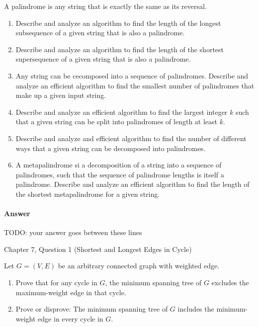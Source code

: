 \documentclass{article}
\begin{document}
A palindrome is any string that is exactly the same as its reversal.
\begin{enumerate}[label=(\alph*)]
    \item Describe and analyze an algorithm to find the length of the longest subsequence of a given string that is also a palindrome.
    \item Describe and analyze an algorithm to find the length of the shortest supersequence of a given string that is also a palindrome.
    \item Any string can be cecomposed into a sequence of palindromes.
    Describe and analyze an efficient algorithm to find the smallest number of palindromes that make up a given input string.
    \item Describe and analyze an efficient algorithm to find the largest integer $k$ such that a given string can be split into palindromes of length at least $k$.
    \item Describe and analyze and efficient algorithm to find the number of different ways that a given string can be decomposed into palindromes.
    \item A metapalindrome si a decomposition of a string into a sequence of palindromes, such that the sequence of palindrome lengths is itself a palindrome.
    Describe and analyze an efficient algorithm to find the length of the shortest metapalindrome for a given string.
\end{enumerate}

\paragraph{Answer}


TODO: your answer goes between these lines


\nextprob
{}

Chapter 7, Question 1 (Shortest and Longest Edges in Cycle)

Let $G = (V, E)$ be an arbitrary connected graph with weighted edge.
\begin{enumerate}[label=(\alph*)]
    \item Prove that for any cycle in $G$, the minimum spanning tree of $G$ excludes the maximum-weight edge in that cycle.
    \item Prove or disprove: The minimum spanning tree of $G$ includes the minimum-weight edge in every cycle in $G$.
\end{enumerate}
\end{document}
